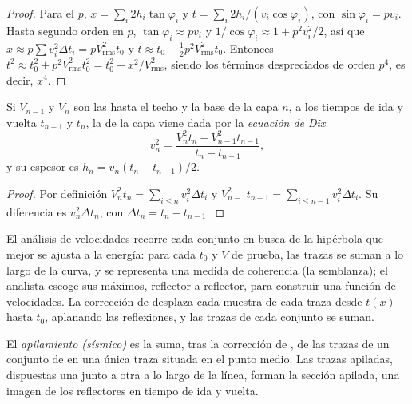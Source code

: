 \begin{proof}
Para el  $p$, $x = \sum_i 2h_i\tan\varphi_i$ y
$t = \sum_i 2h_i/(v_i\cos\varphi_i)$, con $\sin\varphi_i = pv_i$. Hasta segundo
orden en $p$, $\tan\varphi_i \approx pv_i$ y $1/\cos\varphi_i \approx 1 +
p^2v_i^2/2$, así que $x \approx p\sum v_i^2\Delta t_i = pV_{\text{rms}}^2t_0$ y
$t \approx t_0 + \tfrac12p^2V_{\text{rms}}^2t_0$. Entonces
$t^2 \approx t_0^2 + p^2V_{\text{rms}}^2t_0^2 = t_0^2 + x^2/V_{\text{rms}}^2$, siendo los términos
despreciados de orden $p^4$, es decir, $x^4$.
\end{proof}

\begin{theorem}\label{thm:b3:exploration-seismology:dix}
Si $V_{n-1}$ y $V_n$ son las  hasta el techo y la base de la capa
$n$, a los tiempos de ida y vuelta $t_{n-1}$ y $t_n$, la  de la
capa viene dada por la \emph{ecuación de Dix}
\[
  v_n^2 = \frac{V_n^2t_n - V_{n-1}^2t_{n-1}}{t_n - t_{n-1}} ,
\]
y su espesor es $h_n = v_n(t_n - t_{n-1})/2$.
\end{theorem}

\begin{proof}
Por definición $V_n^2t_n = \sum_{i\le n}v_i^2\Delta t_i$ y $V_{n-1}^2t_{n-1}
= \sum_{i\le n-1}v_i^2\Delta t_i$. Su diferencia es $v_n^2\Delta t_n$, con
$\Delta t_n = t_n - t_{n-1}$.
\end{proof}

El análisis de velocidades recorre cada conjunto en busca de la hipérbola que mejor se ajusta a la
energía: para cada $t_0$ y $V$ de prueba, las trazas se suman a lo largo de la curva, y
se representa una medida de coherencia (la semblanza); el analista escoge sus máximos,
reflector a reflector, para construir una función de velocidades. La corrección de 
desplaza cada muestra de cada traza desde $t(x)$ hasta $t_0$, aplanando las
reflexiones, y las trazas de cada conjunto se suman.

\begin{definition}\label{def:b3:exploration-seismology:stack}
El \emph{apilamiento (sísmico)} es la suma, tras la
corrección de , de las trazas de un conjunto de  en una única traza
situada en el punto medio. Las trazas apiladas, dispuestas una junto a otra a lo largo de la línea, forman
la sección apilada, una imagen de los reflectores en tiempo de ida y vuelta.
\end{definition}

